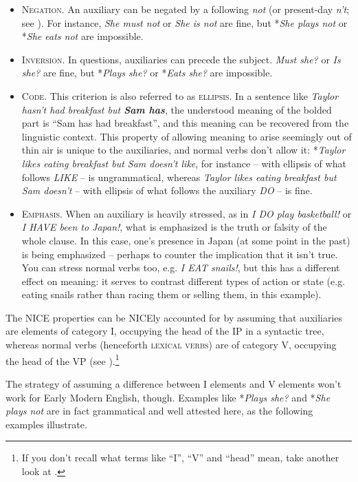 \begin{itemize}
    \item \textsc{Negation}. An auxiliary can be negated by a following \emph{not} (or present-day \emph{n't}; see ). For instance, \emph{She must not} or \emph{She is not} are fine, but *\emph{She plays not} or *\emph{She eats not} are impossible.
    \item \textsc{Inversion}. In questions, auxiliaries can precede the subject. \emph{Must she?} or \emph{Is she?} are fine, but *\emph{Plays she?} or *\emph{Eats she?} are impossible.
    \item \textsc{Code}. This criterion is also referred to as \textsc{ellipsis}. In a sentence like \emph{Taylor hasn't had breakfast but \textbf{Sam has}}, the understood meaning of the bolded part is ``Sam has had breakfast'', and this meaning can be recovered from the linguistic context. This property of allowing meaning to arise seemingly out of thin air is unique to the auxiliaries, and normal verbs don't allow it: *\emph{Taylor likes eating breakfast but Sam doesn't like}, for instance -- with ellipsis of what follows \textit{LIKE} -- is ungrammatical, whereas \emph{Taylor likes eating breakfast but Sam doesn't} -- with ellipsis of what follows the auxiliary \textit{DO} -- is fine.
    \item \textsc{Emphasis}. When an auxiliary is heavily stressed, as in \emph{I DO play basketball!} or \emph{I HAVE been to Japan!}, what is emphasized is the truth or falsity of the whole clause. In this case, one's presence in Japan (at some point in the past) is being emphasized -- perhaps to counter the implication that it isn't true. You can stress normal verbs too, e.g. \emph{I EAT snails!}, but this has a different effect on meaning: it serves to contrast different types of action or state (e.g. eating snails rather than racing them or selling them, in this example).
\end{itemize}

\noindent The NICE properties can be NICEly accounted for by assuming that auxiliaries are elements of category I, occupying the head of the IP in a syntactic tree, whereas normal verbs (henceforth \textsc{lexical verbs}) are of category V, occupying the head of the VP (see \citealp[§4.3]{Los2015}).\footnote{If you don't recall what terms like ``I'', ``V'' and ``head'' mean, take another look at .}

\largerpage
The strategy of assuming a difference between I elements and V elements won't work for Early Modern English, though. Examples like *\emph{Plays she?} and *\emph{She plays not} are in fact grammatical and well attested here, as the following examples illustrate.


